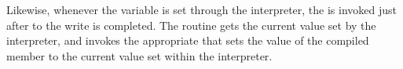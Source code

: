 Likewise,
whenever the variable is set through the interpreter, the
is invoked just after to the write is completed.
The routine gets the current value set by the interpreter, 
and invokes the appropriate
that sets the value of the compiled member to the current value set
within the interpreter.

\endinput

### Local Variables:
### mode: latex
### comment-column: 60
### backup-by-copying-when-linked: t
### file-precious-flag: nil
### End:
